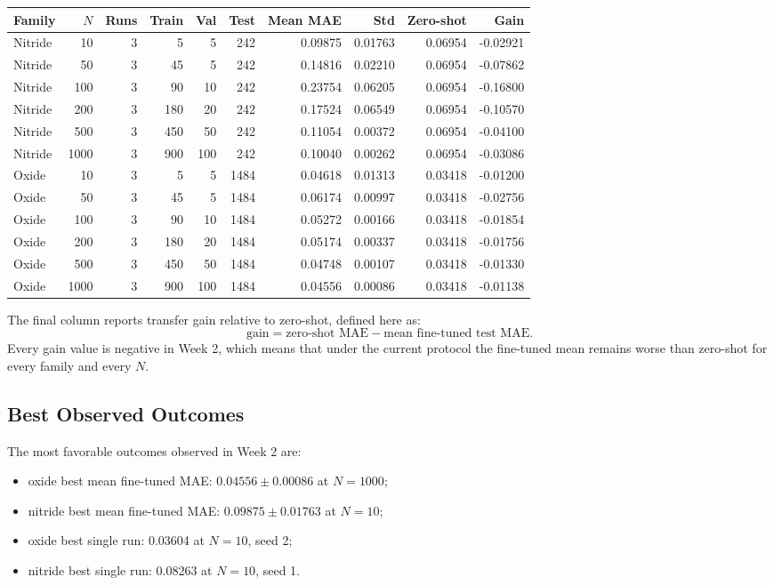 \documentclass[11pt]{article}
\begin{document}
\begin{center}
\small
\begin{tabular}{lrrrrrrrrr}
\toprule
Family & $N$ & Runs & Train & Val & Test & Mean MAE & Std & Zero-shot & Gain \\
\midrule
Nitride & 10   & 3 &   5 &   5 &  242 & 0.09875 & 0.01763 & 0.06954 & -0.02921 \\
Nitride & 50   & 3 &  45 &   5 &  242 & 0.14816 & 0.02210 & 0.06954 & -0.07862 \\
Nitride & 100  & 3 &  90 &  10 &  242 & 0.23754 & 0.06205 & 0.06954 & -0.16800 \\
Nitride & 200  & 3 & 180 &  20 &  242 & 0.17524 & 0.06549 & 0.06954 & -0.10570 \\
Nitride & 500  & 3 & 450 &  50 &  242 & 0.11054 & 0.00372 & 0.06954 & -0.04100 \\
Nitride & 1000 & 3 & 900 & 100 &  242 & 0.10040 & 0.00262 & 0.06954 & -0.03086 \\
Oxide   & 10   & 3 &   5 &   5 & 1484 & 0.04618 & 0.01313 & 0.03418 & -0.01200 \\
Oxide   & 50   & 3 &  45 &   5 & 1484 & 0.06174 & 0.00997 & 0.03418 & -0.02756 \\
Oxide   & 100  & 3 &  90 &  10 & 1484 & 0.05272 & 0.00166 & 0.03418 & -0.01854 \\
Oxide   & 200  & 3 & 180 &  20 & 1484 & 0.05174 & 0.00337 & 0.03418 & -0.01756 \\
Oxide   & 500  & 3 & 450 &  50 & 1484 & 0.04748 & 0.00107 & 0.03418 & -0.01330 \\
Oxide   & 1000 & 3 & 900 & 100 & 1484 & 0.04556 & 0.00086 & 0.03418 & -0.01138 \\
\bottomrule
\end{tabular}
\normalsize
\end{center}

The final column reports transfer gain relative to zero-shot, defined here as:
\[
\text{gain} = \text{zero-shot MAE} - \text{mean fine-tuned test MAE}.
\]
Every gain value is negative in Week 2, which means that under the current protocol the fine-tuned mean remains worse than zero-shot for every family and every $N$.

\subsection{Best Observed Outcomes}
The most favorable outcomes observed in Week 2 are:
\begin{itemize}
  \item oxide best mean fine-tuned MAE: $0.04556 \pm 0.00086$ at $N=1000$;
  \item nitride best mean fine-tuned MAE: $0.09875 \pm 0.01763$ at $N=10$;
  \item oxide best single run: 0.03604 at $N=10$, seed 2;
  \item nitride best single run: 0.08263 at $N=10$, seed 1.
\end{itemize}
\end{document}
